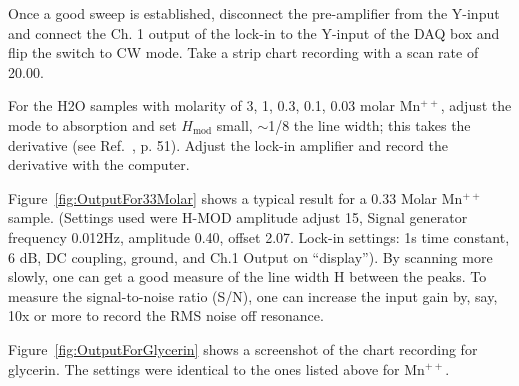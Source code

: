 \documentclass{../lab}
\begin{document}
Once a good sweep is established, disconnect the pre-amplifier from the Y-input and connect the Ch. 1 output of the lock-in to the Y-input of the DAQ box and flip the switch to CW mode. Take a strip chart recording with a scan rate of 20.00.

For the H2O samples with molarity of 3, 1, 0.3, 0.1, 0.03 molar Mn$^{++}$, adjust the mode to absorption and set $H_\text{mod}$ small, $\sim$1/8 the line width; this takes the derivative (see Ref.~\cite{Liboff}, p. 51). Adjust the lock-in amplifier and record the derivative with the computer.

Figure~\ref{fig:OutputFor33Molar} shows a typical result for a 0.33 Molar  Mn$^{++}$ sample. (Settings used were H-MOD amplitude adjust 15, Signal generator frequency 0.012Hz, amplitude 0.40, offset 2.07. Lock-in settings: 1s time constant, 6 dB, DC coupling, ground, and Ch.1 Output on ``display''). By scanning more slowly, one can get a good measure of the line width H between the peaks. To measure the signal-to-noise ratio (S/N), one can increase the input gain by, say, 10x or more to record the RMS noise off resonance.

Figure~\ref{fig:OutputForGlycerin} shows a screenshot of the chart recording for glycerin. The settings were identical to the ones listed above for Mn$^{++}$.
\end{document}
